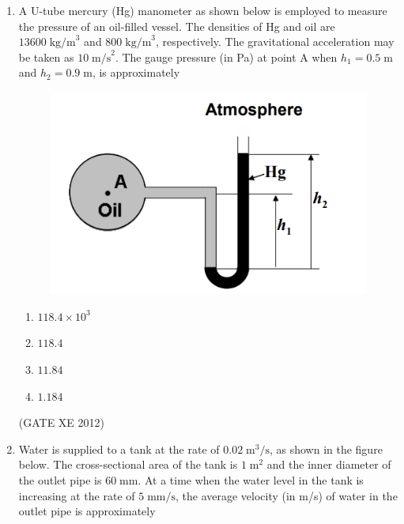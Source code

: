 \documentclass[12pt]{article}
\begin{document}
\begin{enumerate}
\begin{multicols}{2}
\begin{enumerate}
\item $u = x^{3} + x y^{2}, \; v = y^{3} + y x^{2}$
\item $u = 10xt, \; v = -10yt$
\item $u = \left(\dfrac{y}{\delta}\right)^{1/7}, \; v = 0 \;\; (\delta = \text{constant})$
\item $u = 2y, \; v = 2x$
\end{enumerate}
\end{multicols}

(GATE XE 2012)

\item A U-tube mercury (Hg) manometer as shown below is employed to measure the pressure of an oil-filled vessel. The densities of Hg and oil are $13600 \; \text{kg/m}^{3}$ and $800 \; \text{kg/m}^{3}$, respectively. The gravitational acceleration may be taken as $10 \; \text{m/s}^{2}$. The gauge pressure (in Pa) at point A when $h_{1} = 0.5 \; \text{m}$ and $h_{2} = 0.9 \; \text{m}$, is approximately

\begin{figure}[H]
    \centering
    \includegraphics[width=0.5\columnwidth]{figs/ass2_b_q11.png}
    \caption{}
    \label{fig:placeholder}
\end{figure}

\begin{multicols}{4}
\begin{enumerate}
\item $118.4 \times 10^{3}$
\item $118.4$
\item $11.84$
\item $1.184$
\end{enumerate}
\end{multicols}

(GATE XE 2012)

\item Water is supplied to a tank at the rate of $0.02 \; \text{m}^{3}/\text{s}$, as shown in the figure below. The cross-sectional area of the tank is $1 \; \text{m}^{2}$ and the inner diameter of the outlet pipe is $60 \; \text{mm}$. At a time when the water level in the tank is increasing at the rate of $5 \; \text{mm/s}$, the average velocity (in m/s) of water in the outlet pipe is approximately


\end{enumerate}
\end{document}
